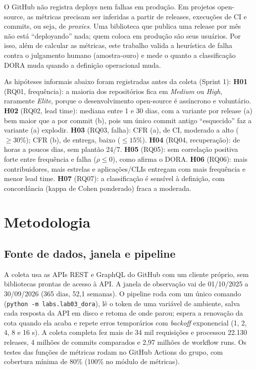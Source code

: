\documentclass[12pt]{article}
\begin{document}
O GitHub não registra deploys nem falhas em produção. Em projetos open-source, as métricas precisam ser inferidas a partir de releases, execuções de CI e commits, ou seja, de \textit{proxies}. Uma biblioteca que publica uma release por mês não está ``deployando'' nada; quem coloca em produção são seus usuários. Por isso, além de calcular as métricas, este trabalho valida a heurística de falha contra o julgamento humano (amostra-ouro) e mede o quanto a classificação DORA muda quando a definição operacional muda.

As hipóteses informais abaixo foram registradas antes da coleta (Sprint 1):
\textbf{H01} (RQ01, frequência): a maioria dos repositórios fica em \textit{Medium} ou \textit{High}, raramente \textit{Elite}, porque o desenvolvimento open-source é assíncrono e voluntário.
\textbf{H02} (RQ02, lead time): mediana entre 1 e 30 dias, com a variante por release (a) bem maior que a por commit (b), pois um único commit antigo ``esquecido'' faz a variante (a) explodir.
\textbf{H03} (RQ03, falha): CFR (a), de CI, moderado a alto ($\ge 30\%$); CFR (b), de entrega, baixo ($\le 15\%$).
\textbf{H04} (RQ04, recuperação): de horas a poucos dias, sem plantão 24/7.
\textbf{H05} (RQ05): sem correlação positiva forte entre frequência e falha ($\rho \le 0$), como afirma o DORA.
\textbf{H06} (RQ06): mais contribuidores, mais estrelas e aplicações/CLIs entregam com mais frequência e menor lead time.
\textbf{H07} (RQ07): a classificação é sensível à definição, com concordância (kappa de Cohen ponderado) fraca a moderada.

\section{Metodologia}

\subsection{Fonte de dados, janela e pipeline}

A coleta usa as APIs REST e GraphQL do GitHub com um cliente próprio, sem bibliotecas prontas de acesso à API. A janela de observação vai de 01/10/2025 a 30/09/2026 (365 dias, 52,1 semanas). O pipeline roda com um único comando (\texttt{python -m labs.lab03\_dora}), lê o token de uma variável de ambiente, salva cada resposta da API em disco e retoma de onde parou; espera a renovação da cota quando ela acaba e repete erros temporários com \textit{backoff} exponencial (1, 2, 4, 8 e 16 s). A coleta completa fez mais de 34 mil requisições e processou 22.130 releases, 4 milhões de commits comparados e 2,97 milhões de workflow runs. Os testes das funções de métricas rodam no GitHub Actions do grupo, com cobertura mínima de 80\% (100\% no módulo de métricas).
\end{document}
